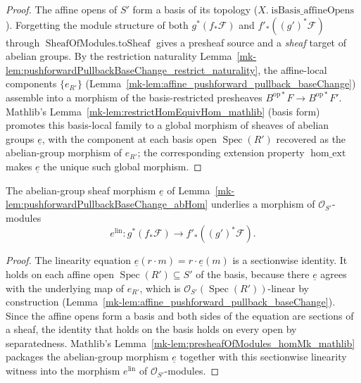 \begin{proof}
  The affine opens of \(S'\) form a basis of its topology
  (\(X.\operatorname{isBasis\_affineOpens}\)). Forgetting the module structure of both
  \(g^*(f_*\mathcal{F})\) and \(f'_*((g')^*\mathcal{F})\) through
  \(\operatorname{SheafOfModules.toSheaf}\) gives a presheaf source and a \emph{sheaf}
  target of abelian groups. By the restriction naturality
  Lemma~\ref{mk-lem:pushforwardPullbackBaseChange_restrict_naturality}, the affine-local
  components \(\{e_{R'}\}\) (Lemma~\ref{mk-lem:affine_pushforward_pullback_baseChange})
  assemble into a morphism of the basis-restricted presheaves
  \(B^{\mathrm{op}*}F \to B^{\mathrm{op}*}F'\). Mathlib's
  Lemma~\ref{mk-lem:restrictHomEquivHom_mathlib} (basis form) promotes this basis-local
  family to a global morphism of sheaves of abelian groups \(\underline{e}\), with the
  component at each basis open \(\operatorname{Spec}(R')\) recovered as the
  abelian-group morphism of \(e_{R'}\); the corresponding extension property
  \(\operatorname{hom\_ext}\) makes \(\underline{e}\) the unique such global morphism.
\end{proof}

\begin{lemma}
  \label{mk-lem:pushforwardPullbackBaseChange_linHom}

  The abelian-group sheaf morphism \(\underline{e}\) of
  Lemma~\ref{mk-lem:pushforwardPullbackBaseChange_abHom} underlies a morphism of
  \(\mathcal{O}_{S'}\)-modules
  \[
    e^{\mathrm{lin}} :
    g^*(f_*\mathcal{F}) \longrightarrow f'_*((g')^*\mathcal{F}).
  \]
\end{lemma}

\begin{proof}
  The linearity equation \(\underline{e}(r \cdot m) = r \cdot \underline{e}(m)\) is a
  sectionwise identity. It holds on each affine open
  \(\operatorname{Spec}(R') \subseteq S'\) of the basis, because there \(\underline{e}\)
  agrees with the underlying map of \(e_{R'}\), which is
  \(\mathcal{O}_{S'}(\operatorname{Spec}(R'))\)-linear by construction
  (Lemma~\ref{mk-lem:affine_pushforward_pullback_baseChange}). Since the affine opens form
  a basis and both sides of the equation are sections of a sheaf, the identity that
  holds on the basis holds on every open by separatedness. Mathlib's
  Lemma~\ref{mk-lem:presheafOfModules_homMk_mathlib} packages the abelian-group morphism
  \(\underline{e}\) together with this sectionwise linearity witness into the morphism
  \(e^{\mathrm{lin}}\) of \(\mathcal{O}_{S'}\)-modules.
\end{proof}

